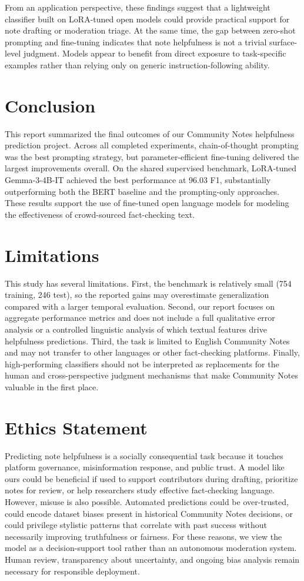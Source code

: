 \documentclass[11pt]{article}
\begin{document}
	From an application perspective, these findings suggest that a lightweight classifier built on LoRA-tuned open models could provide practical support for note drafting or moderation triage. At the same time, the gap between zero-shot prompting and fine-tuning indicates that note helpfulness is not a trivial surface-level judgment. Models appear to benefit from direct exposure to task-specific examples rather than relying only on generic instruction-following ability.
	
	\section{Conclusion}
	This report summarized the final outcomes of our Community Notes helpfulness prediction project. Across all completed experiments, chain-of-thought prompting was the best prompting strategy, but parameter-efficient fine-tuning delivered the largest improvements overall. On the shared supervised benchmark, LoRA-tuned Gemma-3-4B-IT achieved the best performance at 96.03 F1, substantially outperforming both the BERT baseline and the prompting-only approaches. These results support the use of fine-tuned open language models for modeling the effectiveness of crowd-sourced fact-checking text.
	
	\section*{Limitations}
	This study has several limitations. First, the benchmark is relatively small (754 training, 246 test), so the reported gains may overestimate generalization compared with a larger temporal evaluation. Second, our report focuses on aggregate performance metrics and does not include a full qualitative error analysis or a controlled linguistic analysis of which textual features drive helpfulness predictions. Third, the task is limited to English Community Notes and may not transfer to other languages or other fact-checking platforms. Finally, high-performing classifiers should not be interpreted as replacements for the human and cross-perspective judgment mechanisms that make Community Notes valuable in the first place.
	
	\section*{Ethics Statement}
	Predicting note helpfulness is a socially consequential task because it touches platform governance, misinformation response, and public trust. A model like ours could be beneficial if used to support contributors during drafting, prioritize notes for review, or help researchers study effective fact-checking language. However, misuse is also possible. Automated predictions could be over-trusted, could encode dataset biases present in historical Community Notes decisions, or could privilege stylistic patterns that correlate with past success without necessarily improving truthfulness or fairness. For these reasons, we view the model as a decision-support tool rather than an autonomous moderation system. Human review, transparency about uncertainty, and ongoing bias analysis remain necessary for responsible deployment.
	
	
	
	
\end{document}
